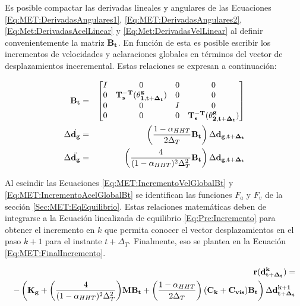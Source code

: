 Es posible compactar las derivadas lineales y angulares de las Ecuaciones \eqref{Eq:MET:DerivadasAngulares1}, \eqref{Eq:MET:DerivadasAngulares2}, \eqref{Eq:Met:DerivadasAcelLinear} y \eqref{Eq:Met:DerivadasVelLinear} al definir convenientemente la matriz $\bf{B_t}$. En función de esta es posible escribir los incrementos de velocidades y aclaraciones globales en términos del vector de desplazamientos inceremental. Estas relaciones se expresan a continuación:
	 
\begin{eqnarray}
	\label{Eq:MET:DefBt}
	\bf{B}_t & = & \bf{\begin{bmatrix}
			I& 0 & 0 & 0\\ 
			0 & \bf{T_s^{-T}}(\bf{\theta^g_{1,{t+\Delta_t}}}) & 0 & 0\\ 
			0& 0 & I & 0\\ 
			0 & 0 & 0 & \bf{T_s^{-T}}(\bf{\theta^g_{2,{t+\Delta_t}}})
	\end{bmatrix}}\\
	\label{Eq:MET:IncrementoVelGlobalBt}
	\Delta \dot{\bf{d_g}}&=& \left(\frac{1-\alpha_{HHT}}{2\Delta_T} \bf{B_t}\right) \Delta
	\bf{d_{g,{t+\Delta_t}}}\\
	\label{Eq:MET:IncrementoAcelGlobalBt}
	\Delta \ddot{\bf{d_g}}&=& \left( \frac{4}{(1-\alpha_{HHT})^2 \Delta_T^2} \bf{B_t} \right)\Delta
	\bf{d_{g,{t+\Delta_t}}}
\end{eqnarray}	



Al escindir las Ecuaciones \eqref{Eq:MET:IncrementoVelGlobalBt} y \eqref{Eq:MET:IncrementoAcelGlobalBt} se identifican las funciones $F_a$ y $F_v$ de la sección \ref{Sec:MET:EqEquilibrio}. Estas relaciones matemáticas deben de integrarse a la Ecuación linealizada de equilibrio \eqref{Eq:Pre:Incremento} para obtener el incremento en $k$ que permita conocer el vector desplazamientos en el paso $k+1$ para el instante $t+\Delta_T$. Finalmente, eso se plantea en la Ecuación \eqref{Eq:MET:FinalIncremento}.


\begin{equation}\label{Eq:MET:FinalIncremento}
	\begin{split}
		\bf{r}(\bf{d}^k_{t+\Delta_t})=\\
		-\left(\bf{K}_g+\text{$\left( \frac{4}{(1-\alpha_{HHT})^2\Delta_T^2} \right)$} \bf{M}\bf{B}_t + \left(\text{$\frac{1-\alpha_{HHT}}{2\Delta_T}$}\right) (\bf{C}_k+\bf{C}_{vis}) \bf{B}_t \right)\Delta\bf{d}^{k+1}_{t+\Delta_t}
	\end{split}
\end{equation}

